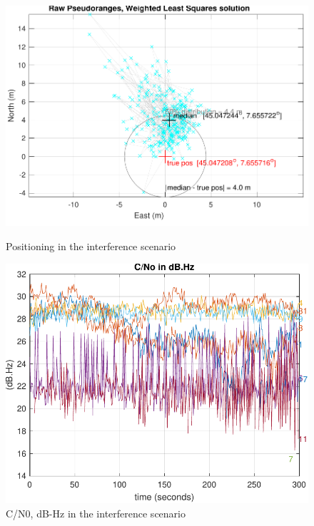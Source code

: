 \begin{figure}[H]
    \centering
    \begin{minipage}[b]{0.48\linewidth}
        \centering
        \includegraphics[width=\linewidth]{images/carne_pos.png}
        
        \caption{Positioning in the interference scenario}
        \label{fig:carne_pos}
    \end{minipage}
    \hfill
    \begin{minipage}[b]{0.48\linewidth}
        \centering
        \includegraphics[width=\linewidth]{images/carne_CN0_carne.pdf}
        \caption{C/N0, dB-Hz in the interference scenario}
        \label{fig:CN0_carne}
    \end{minipage}
\end{figure}

